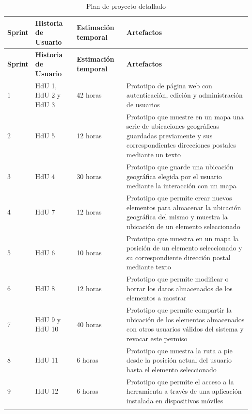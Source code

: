 \begin{longtable}{p{1cm} p{4cm} p{4cm} p{6cm}}
  	\hline  	    
  	\multicolumn{1}{p{1cm}}{\cellcolor{black!30}\textbf{Sprint}} &
    \multicolumn{1}{p{4cm}}{\cellcolor{black!30}\textbf{Historia de Usuario}} & 
 	\multicolumn{1}{p{4cm}}{\cellcolor{black!30}\textbf{Estimación temporal}} &
 	\multicolumn{1}{p{6cm}}{\cellcolor{black!30}\textbf{Artefactos}}
 	\\
 	\toprule 
   	\endfirsthead
     
    \hline
  	\multicolumn{1}{p{1cm}}{\cellcolor{black!30}\textbf{Sprint}} &
    \multicolumn{1}{p{4cm}}{\cellcolor{black!30}\textbf{Historia de Usuario}} & 
 	\multicolumn{1}{p{4cm}}{\cellcolor{black!30}\textbf{Estimación temporal}} &
 	\multicolumn{1}{p{6cm}}{\cellcolor{black!30}\textbf{Artefactos}}
 	\\	 
 	\toprule
 	\endhead

	\rowcolor{gray!25}
	1	& HdU 1, HdU 2 y HdU 3	&	42 horas	&	Prototipo de página web con autenticación, edición y administración de usuarios \\ 
	2	& HdU 5					&	12 horas	&	Prototipo que muestre en un mapa una serie de ubicaciones geográficas guardadas previamente y sus correspondientes direcciones postales mediante un texto \\
	\rowcolor{gray!25}
	3	& HdU 4				&	30 horas	&	Prototipo que guarde una ubicación geográfica elegida por el usuario mediante la interacción con un mapa \\
	4	& HdU 7					&	12 horas	&	Prototipo que permite crear nuevos elementos para almacenar la ubicación geográfica del mismo y muestra la ubicación de un elemento seleccionado \\
	\rowcolor{gray!25}
	5	& HdU 6					& 	10 horas	& 	Prototipo que muestra en un mapa la posición de un elemento seleccionado y su correspondiente dirección postal mediante texto\\
	6	& HdU 8					&	12 horas	&	Prototipo que permite modificar o borrar los datos almacenados de los elementos a mostrar \\
	\rowcolor{gray!25}
	7	& HdU 9 y HdU 10		&	40 horas	&	Prototipo que permite compartir la ubicación de los elementos almacenados con otros usuarios válidos del sistema y revocar este permiso \\
	8	& HdU 11				&	6 horas		&	Prototipo que muestra la ruta a pie desde la posición actual del usuario hasta el elemento seleccionado \\
	\rowcolor{gray!25}
	9	& HdU 12				&	6 horas		&	Prototipo que permite el acceso a la herramienta a través de una aplicación instalada en dispositivos móviles \\
	\hline
	\caption{Plan de proyecto detallado}
	\label{tab:plan_proyecto}
\end{longtable}

